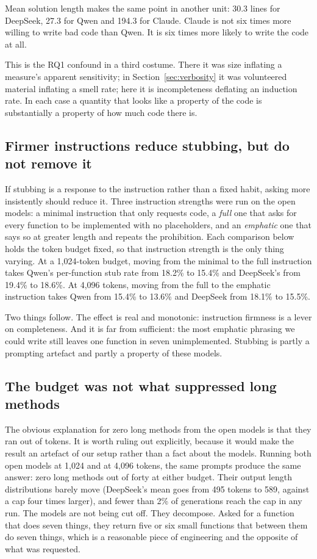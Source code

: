 \documentclass[10pt,a4paper,twocolumn]{article}
\begin{document}
Mean solution length makes the same point in another unit: 30.3 lines for
DeepSeek, 27.3 for Qwen and 194.3 for Claude. Claude is not six times more
willing to write bad code than Qwen. It is six times more likely to write the
code at all.

This is the RQ1 confound in a third costume. There it was size inflating a
measure's apparent sensitivity; in Section~\ref{sec:verbosity} it was volunteered
material inflating a smell rate; here it is incompleteness deflating an
induction rate. In each case a quantity that looks like a property of the code is
substantially a property of how much code there is.

\subsection{Firmer instructions reduce stubbing, but do not remove it}
\label{sec:firmness}

If stubbing is a response to the instruction rather than a fixed habit, asking
more insistently should reduce it. Three instruction strengths were run on the
open models: a minimal instruction that only requests code, a \emph{full} one
that asks for every function to be implemented with no placeholders, and an
\emph{emphatic} one that says so at greater length and repeats the prohibition.
Each comparison below holds the token budget fixed, so that instruction strength
is the only thing varying. At a 1{,}024-token budget, moving from the minimal to
the full instruction takes Qwen's per-function stub rate from 18.2\% to 15.4\%
and DeepSeek's from 19.4\% to 18.6\%. At 4{,}096 tokens, moving from the full to
the emphatic instruction takes Qwen from 15.4\% to 13.6\% and DeepSeek from
18.1\% to 15.5\%.

Two things follow. The effect is real and monotonic: instruction firmness is a
lever on completeness. And it is far from sufficient: the most emphatic phrasing
we could write still leaves one function in seven unimplemented. Stubbing is
partly a prompting artefact and partly a property of these models.

\subsection{The budget was not what suppressed long methods}
\label{sec:budget}

The obvious explanation for zero long methods from the open models is that they
ran out of tokens. It is worth ruling out explicitly, because it would make the
result an artefact of our setup rather than a fact about the models. Running
both open models at 1{,}024 and at 4{,}096 tokens, the same prompts produce the
same answer: zero long methods out of forty at either budget. Their output
length distributions barely move (DeepSeek's mean goes from 495 tokens to 589,
against a cap four times larger), and fewer than 2\% of generations reach the
cap in any run. The models are not being cut off. They decompose. Asked for a
function that does seven things, they return five or six small functions that
between them do seven things, which is a reasonable piece of engineering and the
opposite of what was requested.
\end{document}
